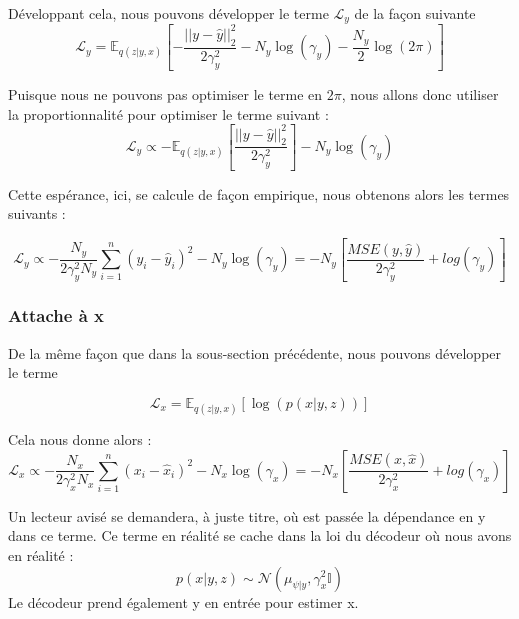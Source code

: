 \documentclass{article}
\begin{document}
Développant cela, nous pouvons développer le terme $\mathcal{L}_y$ de la façon suivante
\begin{equation*}
    \mathcal{L}_y = \mathbb{E}_{q(z|y,x)}\left[-\frac{||y-\hat{y}||^2_2}{2\gamma_y^2} - N_y\log(\gamma_y) - \frac{N_y}{2}\log(2\pi) \right]  
\end{equation*}

Puisque nous ne pouvons pas optimiser le terme en $2\pi$, nous allons donc utiliser la proportionnalité pour optimiser le terme suivant :
\begin{equation}
    \mathcal{L}_y \propto -\mathbb{E}_{q(z|y,x)}\left[\frac{||y-\hat{y}||^2_2}{2\gamma_y^2}\right]  - N_y\log(\gamma_y)
\end{equation}

Cette espérance, ici, se calcule de façon empirique, nous obtenons alors les termes suivants :

\begin{equation*}
    \mathcal{L}_y \propto - \frac{N_y}{2 \gamma_y^2N_y}\sum_{i=1}^n(y_i-\hat{y}_i)^2   - N_y\log(\gamma_y) = -N_y \left[\frac{MSE(y,\hat{y})}{2\gamma_y^2} + log(\gamma_y)\right]
\end{equation*}

\subsubsection{Attache à x}

De la même façon que dans la sous-section précédente, nous pouvons développer le terme 

\begin{equation*}
    \mathcal{L}_x = \mathbb{E}_{q(z|y,x)}\left[\log(p(x|y,z))\right]
\end{equation*}

Cela nous donne alors :
\begin{equation*}
    \mathcal{L}_x \propto - \frac{N_x}{2 \gamma_x^2N_x}\sum_{i=1}^n(x_i-\hat{x}_i)^2   - N_x\log(\gamma_x) = -N_x \left[\frac{MSE(x,\hat{x})}{2\gamma_x^2} + log(\gamma_x)\right]
\end{equation*}

Un lecteur avisé se demandera, à juste titre, où est passée la dépendance en y dans ce terme. Ce terme en réalité se cache dans la loi du décodeur où nous avons en réalité :
\begin{equation}
    p(x|y,z) \sim \mathcal{N}(\mu_{\psi|y}, \gamma_x^2\mathbb{I})
\end{equation}
Le décodeur prend également y en entrée pour estimer x.
\end{document}

